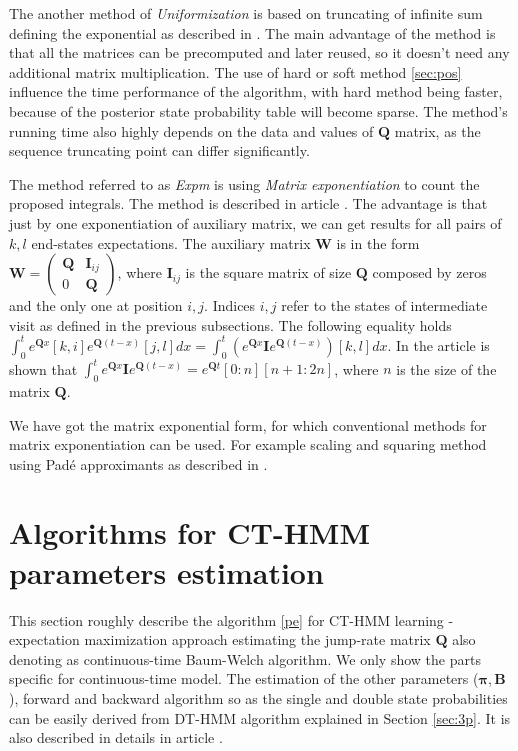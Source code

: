 \documentclass[thesis=M,english]{FITthesis}[2012/10/20]
\newcommand{\matr}[1]{\mathbf{#1}}
\begin{document}
The another method of \textit{Uniformization} is based on truncating of infinite sum defining the exponential as described in \cite{Ho11}. The main advantage of the method is that all the matrices can be precomputed and later reused, so it doesn't need any additional matrix multiplication. \cite{Li15} The use of hard or soft method \ref{sec:pos} influence the time performance of the algorithm, with hard method being faster, because of the posterior state probability table will become sparse. The method's running time also highly depends on the data and values of $\matr{Q}$ matrix, as the sequence truncating point can differ significantly.         

The method referred to as \textit{Expm} is using \textit{Matrix exponentiation} to count the proposed integrals. The method is described in article \cite{Va78}. The advantage is that just by one exponentiation of auxiliary matrix, we can get results for all pairs of $k,l$ end-states expectations. The auxiliary matrix $\matr{W}$ is in the form $\matr{W} =  \begin{pmatrix} \matr{Q} & \matr{I}_{ij} \\ 0 & \matr{Q} \end{pmatrix} $, where $\matr{I}_{ij}$ is the square matrix of size $\matr{Q}$ composed by zeros and the only one at position $i,j$. Indices $i,j$ refer to the states of intermediate visit as defined in the previous subsections. The following equality holds $ \int_{0}^{t} {e^{\matr{Q}x}}[k,i] {e^{\matr{Q}(t-x)}}[j,l] dx  =  \int_{0}^{t} ( e^{\matr{Q}x} \matr{I} e^{\matr{Q}(t-x)} )[k,l] dx $. In the article \cite{Va78} is shown that $\int_{0}^{t}  e^{\matr{Q}x} \matr{I} e^{\matr{Q}(t-x)} = {e^{\matr{Q}t}}[0:n][n+1:2n]$, where $n$ is the size of the matrix $\matr{Q}$.

We have got the matrix exponential form, for which conventional methods for matrix exponentiation can be used. For example scaling and squaring method using Pad\'{e} approximants as described in \cite{Hi08}.      


\section{Algorithms for CT-HMM parameters estimation}\label{sec:alg}

This section roughly describe the algorithm \ref{pe} for CT-HMM learning - expectation maximization approach estimating the jump-rate matrix $\matr{Q}$ also denoting as continuous-time Baum-Welch algorithm. We only show the parts specific for continuous-time model. The estimation of the other parameters ($\boldsymbol{\pi},\matr{B}$), forward and backward algorithm so as the single and double state probabilities can be easily derived from DT-HMM algorithm explained in Section \ref{sec:3p}. It is also described in details in article \cite{Ra89}.
\end{document}
